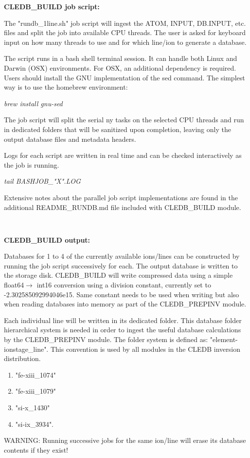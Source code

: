 \documentclass{article}
\begin{document}
\newpage

\textbf{CLEDB\_BUILD job script:}

The "{\color{red}rundb\_1line.sh}" job script will ingest the ATOM, INPUT, DB.INPUT, etc. files and split the job into available CPU threads. The user is asked for keyboard input on how many threads to use and for which line/ion to generate a database.

The script runs in a bash shell terminal session. It can handle both Linux and Darwin (OSX) environments. For OSX, an additional dependency is required. Users should install the GNU implementation of the sed command. The simplest way is to use the homebrew environment:

\emph{\color{red} brew install gnu-sed}

The job script will split the serial ny tasks on the selected CPU threads and run in dedicated folders that will be sanitized upon completion, leaving only the output database files and metadata headers. 

Logs for each script are written in real time and can be checked interactively as the job is running.

\emph{\color{red} tail BASHJOB\_"X".LOG}

Extensive notes about the parallel job script implementations are found in the additional README\_RUNDB.md file included with CLEDB\_BUILD module.

~ 

\textbf{CLEDB\_BUILD output:}

Databases for 1 to 4 of the currently available ions/lines can be constructed by running the job script successively for each.
The output database is written to the storage disk. CLEDB\_BUILD will write compressed data using a simple float64$\rightarrow$ int16 conversion using a division constant, currently set to -2.302585092994046e15. Same constant needs to be used when writing but also when reading databases into memory as part of the CLEDB\_PREPINV module.

Each individual line will be written in its dedicated folder. This database folder hierarchical system is needed in order to ingest the useful database calculations by the CLEDB\_PREPINV module. The folder system is defined as: "element-ionstage\_line". This convention is used by all modules in the CLEDB inversion distribution.
\begin{enumerate}
 \item "fe-xiii\_1074" 
 \item "fe-xiii\_1079"
 \item "si-x\_1430"
 \item "si-ix\_3934". 
\end{enumerate}
WARNING: Running successive jobs for the same ion/line will erase its database contents if they exist! 
\end{document}
